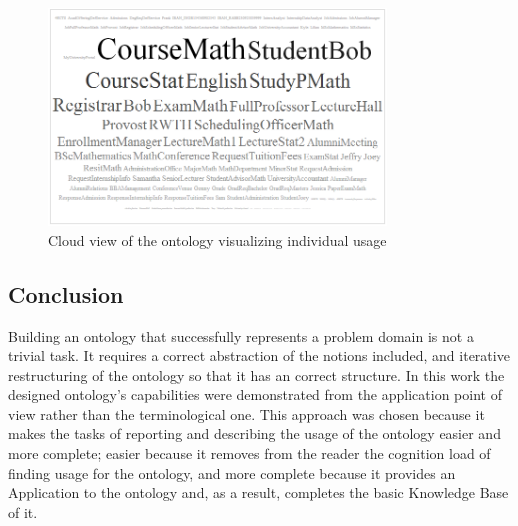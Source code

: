 \documentclass{article}    %
\begin{document}
\begin{figure}[htbp]
  \centering
    \includegraphics[width=0.8\textwidth]{Materials/Figures/cloudIndies.png}
    \caption{Cloud view of the ontology visualizing individual usage}
  \label{cloudIndi}
\end{figure}

% 
\subsection{Conclusion}
%
Building an ontology that successfully represents a problem domain is not a trivial task. It requires a correct abstraction of the notions included, and iterative restructuring of the ontology so that it has an correct structure. In this work the designed ontology's capabilities were demonstrated from the application point of view rather than the terminological one. This approach was chosen because it makes the tasks of reporting and describing the usage of the ontology easier and more complete; easier because it removes from the reader the cognition load of finding usage for the ontology, and more complete because it provides an Application to the ontology and, as a result, completes the basic Knowledge Base of it.
\end{document}
